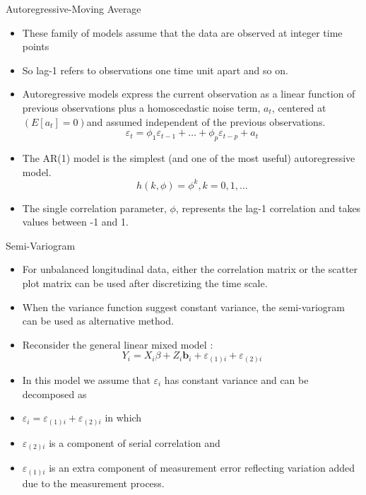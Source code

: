 \documentclass{beamer}
\begin{document}
\begin{frame}{Autoregressive-Moving Average}
\begin{itemize}
\item These family of models assume that the data are observed at integer time points
\item So lag-1 refers to observations one time unit apart and so on.
\item Autoregressive models express the current observation as a linear function of previous observations plus a homoscedastic noise term, $a_t$, centered at $(E[a_t]=0)$and assumed independent of the previous observations.
\begin{equation*}
\varepsilon_{t}=\phi_1\varepsilon_{t-1} + \ldots + \phi_p\varepsilon_{t-p} + a_{t}	
\end{equation*}
\item The AR(1) model is the simplest (and one of the most useful) autoregressive model.
\begin{equation*}
h(k,\phi)=\phi^k,k=0,1,\ldots	
\end{equation*}
\item The single correlation parameter, $\phi$, represents the lag-1 correlation and takes values between -1 and 1.\\
\end{itemize}
\end{frame}

\begin{frame}{Semi-Variogram}
\begin{itemize}
\item For unbalanced longitudinal data, either the correlation matrix or the scatter plot matrix can be used after discretizing  the time scale.
\item When the variance function suggest constant variance, the semi-variogram can be used as alternative method.
\item Reconsider the general linear mixed model :
\begin{equation*}
Y_{i}= X _{i}\beta  + Z _{i} \textbf{b}_{i} + \varepsilon_{(1)i} +\varepsilon_{(2)i}
\end{equation*}
\item In this model we assume that $ \varepsilon_i $ has constant variance and can be decomposed as
\item $ \varepsilon_{i} =  \varepsilon_{(1)i} +\varepsilon_{(2)i} $ in which 
\item $\varepsilon_{(2)i} $ is a component of serial correlation and 
\item $\varepsilon_{(1)i} $ is an extra component of measurement error reflecting variation added due to the measurement process.
\end{itemize}
\end{frame}
\end{document}
